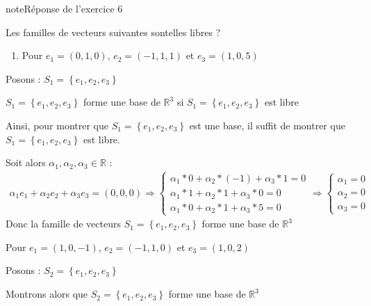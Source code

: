 \documentclass[letterpaper,10pt,french]{jupyterBook}
\begin{document}
\begin{sphinxadmonition}{note}{Réponse de l’exercice 6}

\sphinxAtStartPar
Les familles de vecteurs suivantes sont\sphinxhyphen{}elles libres ?
\begin{enumerate}
%
\item {} 
\sphinxAtStartPar
Pour \(e_1 =(0,1,0)\), \(e_2 =(-1,1,1)\) et \(e_3 =(1,0,5)\)

\end{enumerate}

\sphinxAtStartPar
Posons : \(S_1 = \left\{  e_1, e_2, e_3 \right\} \)

\sphinxAtStartPar
\(S_1 = \left\{  e_1, e_2, e_3 \right\} \) forme une base de \(\mathbb{R}^3\) si \(S_1 = \left\{  e_1, e_2, e_3 \right\} \) est libre

\sphinxAtStartPar
Ainsi, pour montrer que \(S_1 = \left\{  e_1, e_2, e_3 \right\} \) est une base, il suffit de montrer que \(S_1 = \left\{  e_1, e_2, e_3 \right\} \) est libre.

\sphinxAtStartPar
Soit alors \(\alpha_1, \alpha_2,\alpha_3 \in \mathbb{R}\) :
\begin{equation*}
\begin{split}
\alpha_1 e_1 + \alpha_2 e_2 + \alpha_3 e_3= (0,0,0) \Rightarrow 
    \begin{cases}
      \alpha_1*0 + \alpha_2* (-1) +\alpha_3*1= 0 \\
      \alpha_1*1 + \alpha_2*1 + \alpha_3*0= 0 \\
      \alpha_1*0 + \alpha_2*1 + \alpha_3*5= 0 
      \end{cases}
\Rightarrow        
       \begin{cases}
      \alpha_1 = 0 \\
      \alpha_2 = 0 \\
      \alpha_3 = 0 
      \end{cases}
\end{split}
\end{equation*}
\sphinxAtStartPar
Donc la famille de vecteurs \(S_1 = \left\{  e_1, e_2, e_3 \right\} \) forme une base de \(\mathbb{R}^3\)

\sphinxhyphen{}  Pour \(e_1=(1,0,-1)\), \(e_2=(-1,1,0)\) et \(e_3=(1,0,2)\)

\sphinxAtStartPar
Posons : \(S_2 = \left\{  e_1, e_2, e_3 \right\} \)

\sphinxAtStartPar
Montrons alors que \(S_2 = \left\{  e_1, e_2, e_3 \right\} \) forme une base de \(\mathbb{R}^3\)


\end{sphinxadmonition}
\end{document}
